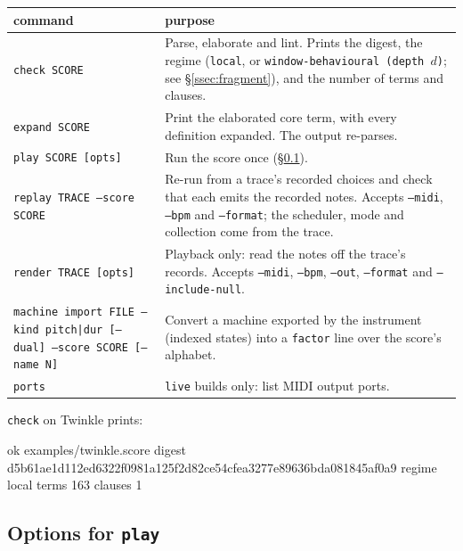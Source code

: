 \documentclass[11pt,a4paper]{article}
\newcommand{\ttx}[1]{\texttt{#1}}
\begin{document}
\begin{center}
\small
\begin{tabularx}{\linewidth}{@{}>{\raggedright\arraybackslash}p{5.2cm}>{\raggedright\arraybackslash}X@{}}
\toprule
command & purpose \\
\midrule
\ttx{check SCORE} & Parse, elaborate and lint. Prints the digest, the regime
  (\ttx{local}, or \ttx{window-behavioural (depth $d$)}; see
  \S\ref{ssec:fragment}), and the number of terms and clauses. \\
\ttx{expand SCORE} & Print the elaborated core term, with every definition
  expanded. The output re-parses. \\
\ttx{play SCORE [opts]} & Run the score once (\S\ref{ssec:playopts}). \\
\ttx{replay TRACE --score SCORE} & Re-run from a trace's recorded choices and
  check that each emits the recorded notes. Accepts \ttx{--midi}, \ttx{--bpm}
  and \ttx{--format}; the scheduler, mode and collection come from the
  trace. \\
\ttx{render TRACE [opts]} & Playback only: read the notes off the trace's
  records. Accepts \ttx{--midi}, \ttx{--bpm}, \ttx{--out}, \ttx{--format} and
  \ttx{--include-null}. \\
\ttx{machine import FILE --kind pitch|dur [--dual] --score SCORE [--name N]} &
  Convert a machine exported by the instrument (indexed states) into a
  \ttx{factor} line over the score's alphabet. \\
\ttx{ports} & \ttx{live} builds only: list MIDI output ports. \\
\bottomrule
\end{tabularx}
\end{center}

\noindent \ttx{check} on Twinkle prints:
\begin{out}
ok examples/twinkle.score
digest  d5b61ae1d112ed6322f0981a125f2d82ce54cfea3277e89636bda081845af0a9
regime  local
terms   163   clauses 1
\end{out}

\subsection{Options for \ttx{play}}\label{ssec:playopts}
\end{document}
